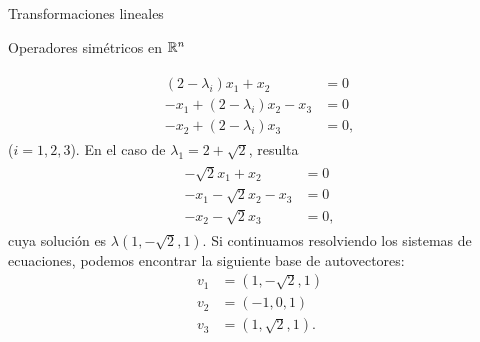\begin{chapter}{Transformaciones lineales}
\begin{section}{Operadores simétricos en $\mathbb R^n$}
\begin{ejemplo*}
        \begin{align*}
        \begin{split}
        (2 -\lambda_i)x_1+ x_2  &= 0 \\
        -x_1 +(2-\lambda_i)x_2  -x_3 &=0 \\
        -x_2 + (2-\lambda_i)x_3 &= 0,  
        \end{split}
        \end{align*}
        ($i=1,2,3$).
        En el caso de $\lambda_1= 2 + \sqrt 2$,  resulta
        \begin{align*}
        \begin{split}
        -\sqrt 2x_1+ x_2  &= 0 \\
        -x_1 -\sqrt 2x_2  -x_3 &=0 \\
        -x_2 -\sqrt 2x_3 &= 0,  
        \end{split}
        \end{align*}
        cuya solución es $\lambda(1, -\sqrt2, 1)$. Si continuamos resolviendo los sistemas de ecuaciones, podemos encontrar la siguiente base de autovectores:
        \begin{align*}
        v_1 &= (1, -\sqrt2, 1) \\		
        v_2 &= (-1, 0, 1) \\		
        v_3 &= (1, \sqrt2, 1).
        \end{align*}
        
    \end{ejemplo*}
    

\end{section}
\end{chapter}
